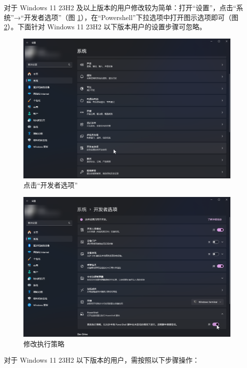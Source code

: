 对于 Windows 11 23H2 及以上版本的用户修改较为简单：打开“设置”，点击“系统”→“开发者选项”（图 \ref{ch0fig-win11-23h2-0}），在“Powershell”下拉选项中打开图示选项即可（图 \ref{ch0fig-win11-23h2-1}）。下面针对 Windows 11 23H2 以下版本用户的设置步骤可忽略。

\begin{figure}[H]
    \Centering
    \includegraphics[width=\textwidth]{assets/intro/win11_23h2_00.png}
    \caption{点击“开发者选项”}
    \label{ch0fig-win11-23h2-0}
\end{figure}

\begin{figure}[H]
    \Centering
    \includegraphics[width=\textwidth]{assets/intro/win11_23h2_01.png}
    \caption{修改执行策略}
    \label{ch0fig-win11-23h2-1}
\end{figure}

对于 Windows 11 23H2 以下版本的用户，需按照以下步骤操作：

